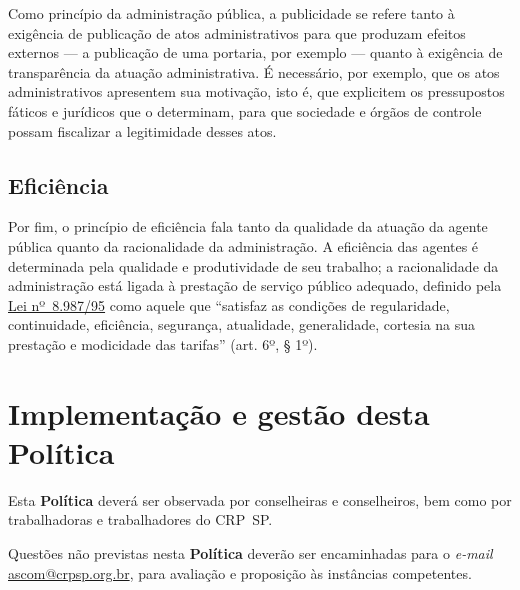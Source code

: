 Como princípio da administração pública, a publicidade se refere tanto à
exigência de publicação de atos administrativos para que produzam
efeitos externos --- a publicação de uma portaria, por exemplo ---
quanto à exigência de transparência da atuação administrativa. É
necessário, por exemplo, que os atos administrativos apresentem sua
motivação, isto é, que explicitem os pressupostos fáticos e jurídicos
que o determinam, para que sociedade e órgãos de controle possam
fiscalizar a legitimidade desses atos.

\subsection{Eficiência}

Por fim, o princípio de eficiência fala tanto da qualidade da atuação da
agente pública quanto da racionalidade da administração. A eficiência
das agentes é determinada pela qualidade e produtividade de seu
trabalho; a racionalidade da administração está ligada à prestação de
serviço público adequado, definido pela
\href{https://www.planalto.gov.br/ccivil_03/leis/l8987cons.htm}{Lei nº~8.987/95} como aquele que ``satisfaz as condições de regularidade,
continuidade, eficiência, segurança, atualidade, generalidade, cortesia
na sua prestação e modicidade das tarifas'' (art. 6º, § 1º).

\section{Implementação e gestão desta
  Política}

Esta \textbf{Política} deverá ser observada por conselheiras e
conselheiros, bem como por trabalhadoras e trabalhadores do CRP~SP.

Questões não previstas nesta \textbf{Política} deverão ser encaminhadas
para o \emph{e-mail}
\href{mailto:ascom@crpsp.org.br}{{ascom@crpsp.org.br}}, para
avaliação e proposição às instâncias competentes.